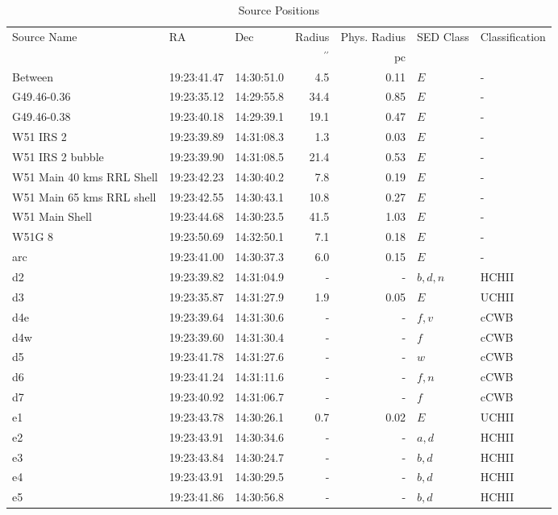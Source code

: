 \begin{table*}[htp]
\caption{Source Positions}
\begin{tabular}{lllrrll}
\label{tab:positions}
Source Name & RA & Dec & Radius & Phys. Radius & SED Class & Classification \\
 &  &  & $\mathrm{{}^{\prime\prime}}$ & $\mathrm{pc}$ &  &  \\
\hline
Between & 19:23:41.47 & 14:30:51.0 & 4.5 & 0.11 & $E$ & - \\
G49.46-0.36 & 19:23:35.12 & 14:29:55.8 & 34.4 & 0.85 & $E$ & - \\
G49.46-0.38 & 19:23:40.18 & 14:29:39.1 & 19.1 & 0.47 & $E$ & - \\
W51 IRS 2 & 19:23:39.89 & 14:31:08.3 & 1.3 & 0.03 & $E$ & - \\
W51 IRS 2 bubble & 19:23:39.90 & 14:31:08.5 & 21.4 & 0.53 & $E$ & - \\
W51 Main 40 kms RRL Shell & 19:23:42.23 & 14:30:40.2 & 7.8 & 0.19 & $E$ & - \\
W51 Main 65 kms RRL shell & 19:23:42.55 & 14:30:43.1 & 10.8 & 0.27 & $E$ & - \\
W51 Main Shell & 19:23:44.68 & 14:30:23.5 & 41.5 & 1.03 & $E$ & - \\
W51G 8 & 19:23:50.69 & 14:32:50.1 & 7.1 & 0.18 & $E$ & - \\
arc & 19:23:41.00 & 14:30:37.3 & 6.0 & 0.15 & $E$ & - \\
d2 & 19:23:39.82 & 14:31:04.9 & - & - & $b,d,n$ & HCHII \\
d3 & 19:23:35.87 & 14:31:27.9 & 1.9 & 0.05 & $E$ & UCHII \\
d4e & 19:23:39.64 & 14:31:30.6 & - & - & $f,v$ & cCWB \\
d4w & 19:23:39.60 & 14:31:30.4 & - & - & $f$ & cCWB \\
d5 & 19:23:41.78 & 14:31:27.6 & - & - & $w$ & cCWB \\
d6 & 19:23:41.24 & 14:31:11.6 & - & - & $f,n$ & cCWB \\
d7 & 19:23:40.92 & 14:31:06.7 & - & - & $f$ & cCWB \\
e1 & 19:23:43.78 & 14:30:26.1 & 0.7 & 0.02 & $E$ & UCHII \\
e2 & 19:23:43.91 & 14:30:34.6 & - & - & $a,d$ & HCHII \\
e3 & 19:23:43.84 & 14:30:24.7 & - & - & $b,d$ & HCHII \\
e4 & 19:23:43.91 & 14:30:29.5 & - & - & $b,d$ & HCHII \\
e5 & 19:23:41.86 & 14:30:56.8 & - & - & $b,d$ & HCHII \\

\end{tabular}
\end{table*}

